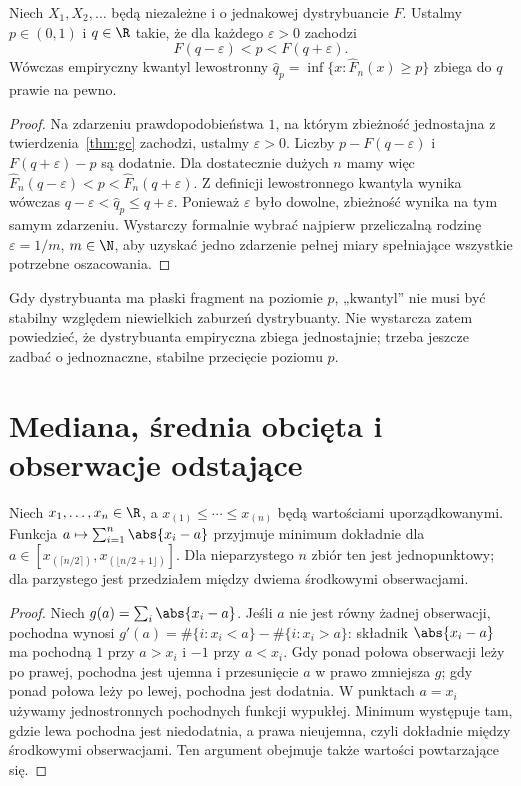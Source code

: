 \begin{twierdzenie}\label{thm:quant-consistency}
Niech $X_1,X_2,\ldots$ będą niezależne i o jednakowej dystrybuancie $F$. Ustalmy $p\in(0,1)$ i $q\in\R$ takie, że dla każdego $\varepsilon>0$ zachodzi
\[
F(q-\varepsilon)<p<F(q+\varepsilon).
\]
Wówczas empiryczny kwantyl lewostronny $\widehat q_p=\inf\{x:\widehat F_n(x)\ge p\}$ zbiega do $q$ prawie na pewno.
\end{twierdzenie}
\begin{proof}
Na zdarzeniu prawdopodobieństwa $1$, na którym zbieżność jednostajna z twierdzenia~\ref{thm:gc} zachodzi, ustalmy $\varepsilon>0$. Liczby $p-F(q-\varepsilon)$ i $F(q+\varepsilon)-p$ są dodatnie. Dla dostatecznie dużych $n$ mamy więc $\widehat F_n(q-\varepsilon)<p<\widehat F_n(q+\varepsilon)$. Z definicji lewostronnego kwantyla wynika wówczas $q-\varepsilon<\widehat q_p\le q+\varepsilon$. Ponieważ $\varepsilon$ było dowolne, zbieżność wynika na tym samym zdarzeniu. Wystarczy formalnie wybrać najpierw przeliczalną rodzinę $\varepsilon=1/m$, $m\in\N$, aby uzyskać jedno zdarzenie pełnej miary spełniające wszystkie potrzebne oszacowania.
\end{proof}

\begin{uwaga}
Gdy dystrybuanta ma płaski fragment na poziomie $p$, „kwantyl” nie musi być stabilny względem niewielkich zaburzeń dystrybuanty. Nie wystarcza zatem powiedzieć, że dystrybuanta empiryczna zbiega jednostajnie; trzeba jeszcze zadbać o jednoznaczne, stabilne przecięcie poziomu $p$.
\end{uwaga}

\section{Mediana, średnia obcięta i obserwacje odstające}\label{sec:robust}
\begin{stwierdzenie}\label{prop:median-min}
Niech $x_1,\ldots,x_n\in\R$, a $x_{(1)}\le\cdots\le x_{(n)}$ będą wartościami uporządkowanymi. Funkcja $a\mapsto\sum_{i=1}^n\abs{x_i-a}$ przyjmuje minimum dokładnie dla $a\in[x_{(\lceil n/2\rceil)},x_{(\lfloor n/2+1\rfloor)}]$. Dla nieparzystego $n$ zbiór ten jest jednopunktowy; dla parzystego jest przedziałem między dwiema środkowymi obserwacjami.
\end{stwierdzenie}
\begin{proof}
Niech $g(a)=\sum_i\abs{x_i-a}$. Jeśli $a$ nie jest równy żadnej obserwacji, pochodna wynosi $g'(a)=\#\{i:x_i<a\}-\#\{i:x_i>a\}$: składnik $\abs{x_i-a}$ ma pochodną $1$ przy $a>x_i$ i $-1$ przy $a<x_i$. Gdy ponad połowa obserwacji leży po prawej, pochodna jest ujemna i przesunięcie $a$ w prawo zmniejsza $g$; gdy ponad połowa leży po lewej, pochodna jest dodatnia. W punktach $a=x_i$ używamy jednostronnych pochodnych funkcji wypukłej. Minimum występuje tam, gdzie lewa pochodna jest niedodatnia, a prawa nieujemna, czyli dokładnie między środkowymi obserwacjami. Ten argument obejmuje także wartości powtarzające się.
\end{proof}

